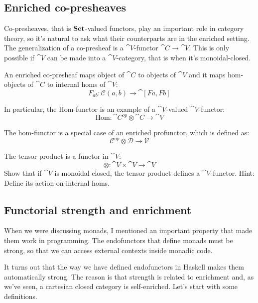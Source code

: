 \documentclass[DaoFP]{subfiles}
\begin{document}
\subsection{Enriched co-presheaves}
Co-presheaves, that is $\mathbf{Set}$-valued functors, play an important role in category theory, so it's natural to ask what their counterparts are in the enriched setting. The generalization of a co-presheaf is a $\cat V$-functor $\cat C \to \cat V$. This is only possible if $\cat V$ can be made into a $\cat V$-category, that is when it's monoidal-closed. 

An enriched co-presheaf maps object of $\cat C$ to objects of $\cat V$ and it maps hom-objects of $\cat C$ to internal homs of $\cat V$:
\[ F_{a b} \colon \mathcal C (a, b) \to \cat [F a, F b] \]

In particular, the $\text{Hom}$-functor is an example of a $\cat V$-valued $\cat V$-functor:
\[ \text{Hom} \colon \cat C^{op} \otimes \cat C \to \cat V \]

The hom-functor is a special case of an enriched profunctor, which is defined as:
\[ \mathcal C^{op} \otimes \mathcal D \to \mathcal V \]

\begin{exercise}
The tensor product is a functor in $\cat V$:
\[ \otimes \colon \cat V \times \cat V \to \cat V \]
Show that if $\cat V$ is monoidal closed, the tensor product defines a $\cat V$-functor. Hint: Define its action on internal homs.
\end{exercise}

\subsection{Functorial strength and enrichment}

When we were discussing monads, I mentioned an important property that made them work in programming. The endofunctors that define monads must be strong, so that we can access external contexts inside monadic code. 

It turns out that the way we have defined endofunctors in Haskell makes them automatically strong. The reason is that strength is related to enrichment and, as we've seen, a cartesian closed category is self-enriched. Let's start with some definitions.
\end{document}
